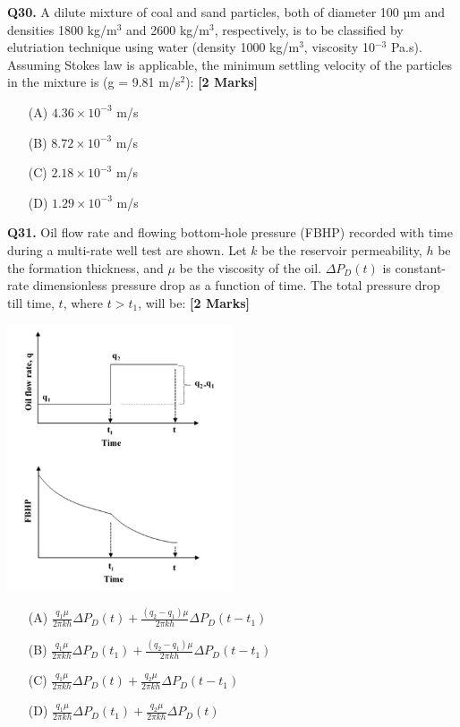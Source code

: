 \documentclass[11pt]{article}
\newcommand{\questionb}[2]{
    \noindent\textbf{Q#2.} #1 \hfill \textbf{[2 Marks]}
}
\begin{document}
\questionb{A dilute mixture of coal and sand particles, both of diameter 100 µm and densities 1800 kg/m\(^3\) and 2600 kg/m\(^3\), respectively, is to be classified by elutriation technique using water (density 1000 kg/m\(^3\), viscosity 10\(^{-3}\) Pa.s). Assuming Stokes law is applicable, the minimum settling velocity of the particles in the mixture is (g = 9.81 m/s\(^2\)):}{30}
\begin{enumerate}
    \item[(A)] \( 4.36 \times 10^{-3} \) m/s  
    \item[(B)] \( 8.72 \times 10^{-3} \) m/s  
    \item[(C)] \( 2.18 \times 10^{-3} \) m/s  
    \item[(D)] \( 1.29 \times 10^{-3} \) m/s  
\end{enumerate}
\vspace{0.5cm}

\questionb{Oil flow rate and flowing bottom-hole pressure (FBHP) recorded with time during a multi-rate well test are shown. Let \( k \) be the reservoir permeability, \( h \) be the formation thickness, and \( \mu \) be the viscosity of the oil. \( \Delta P_D(t) \) is constant-rate dimensionless pressure drop as a function of time. The total pressure drop till time, \( t \), where \( t > t_1 \), will be:}{31}
\begin{center}
\includegraphics[width=0.5\textwidth]{figures/31.png}
\end{center}
\begin{enumerate}
    \item[(A)] \( \frac{q_1 \mu}{2\pi k h} \Delta P_D(t) + \frac{(q_2 - q_1)\mu}{2\pi k h} \Delta P_D(t - t_1) \)  
    \item[(B)] \( \frac{q_1 \mu}{2\pi k h} \Delta P_D(t_1) + \frac{(q_2 - q_1)\mu}{2\pi k h} \Delta P_D(t - t_1) \)  
    \item[(C)] \( \frac{q_1 \mu}{2\pi k h} \Delta P_D(t) + \frac{q_2 \mu}{2\pi k h} \Delta P_D(t - t_1) \)  
    \item[(D)] \( \frac{q_1 \mu}{2\pi k h} \Delta P_D(t_1) + \frac{q_2 \mu}{2\pi k h} \Delta P_D(t) \)  
\end{enumerate}
\vspace{0.5cm}
\end{document}
